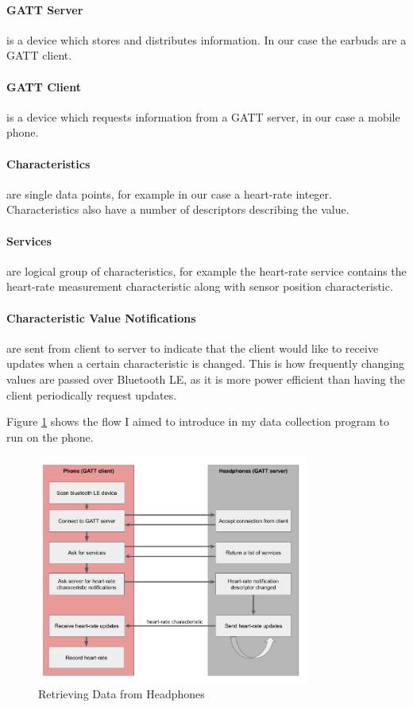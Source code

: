 \documentclass[12pt,a4paper,twoside,openright]{report}
\begin{document}
\paragraph{GATT Server} is a device which stores and distributes information. In
our case the earbuds are a GATT client.

\paragraph{GATT Client} is a device which requests information from a GATT
server, in our case a mobile phone.

\paragraph{Characteristics} are single data points, for example in our case a
heart-rate integer. Characteristics also have a number of descriptors
describing the value.

\paragraph{Services} are logical group of characteristics, for example the
heart-rate service contains the heart-rate measurement characteristic along
with sensor position characteristic.

\paragraph{Characteristic Value Notifications} are sent from client to server
to indicate that the client would like to receive updates when a certain
characteristic is changed. This is how frequently changing values are passed
over Bluetooth LE, as it is more power efficient than having the client
periodically request updates.

Figure \ref{fig:gatt-flow} shows the flow I aimed to introduce in my data collection program to run
on the phone. 

\begin{figure}[tbh]
	\centerline{\includegraphics[width=0.8\textwidth]{figs/gatt-flow.png}}
	\caption{Retrieving Data from Headphones}
	\label{fig:gatt-flow}
\end{figure}
\end{document}
